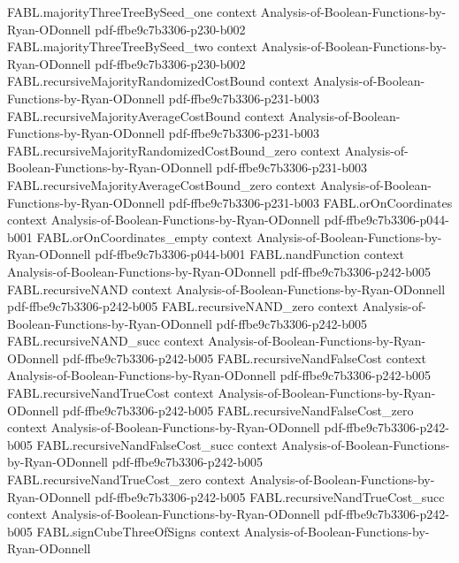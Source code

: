 \begin{theorem}
\proofstep
  {FABL.majorityThreeTreeBySeed_one}
  {context}
  {Analysis-of-Boolean-Functions-by-Ryan-ODonnell}
  {pdf-ffbe9c7b3306-p230-b002}
\proofstep
  {FABL.majorityThreeTreeBySeed_two}
  {context}
  {Analysis-of-Boolean-Functions-by-Ryan-ODonnell}
  {pdf-ffbe9c7b3306-p230-b002}
\proofstep
  {FABL.recursiveMajorityRandomizedCostBound}
  {context}
  {Analysis-of-Boolean-Functions-by-Ryan-ODonnell}
  {pdf-ffbe9c7b3306-p231-b003}
\proofstep
  {FABL.recursiveMajorityAverageCostBound}
  {context}
  {Analysis-of-Boolean-Functions-by-Ryan-ODonnell}
  {pdf-ffbe9c7b3306-p231-b003}
\proofstep
  {FABL.recursiveMajorityRandomizedCostBound_zero}
  {context}
  {Analysis-of-Boolean-Functions-by-Ryan-ODonnell}
  {pdf-ffbe9c7b3306-p231-b003}
\proofstep
  {FABL.recursiveMajorityAverageCostBound_zero}
  {context}
  {Analysis-of-Boolean-Functions-by-Ryan-ODonnell}
  {pdf-ffbe9c7b3306-p231-b003}
\proofstep
  {FABL.orOnCoordinates}
  {context}
  {Analysis-of-Boolean-Functions-by-Ryan-ODonnell}
  {pdf-ffbe9c7b3306-p044-b001}
\proofstep
  {FABL.orOnCoordinates_empty}
  {context}
  {Analysis-of-Boolean-Functions-by-Ryan-ODonnell}
  {pdf-ffbe9c7b3306-p044-b001}
\proofstep
  {FABL.nandFunction}
  {context}
  {Analysis-of-Boolean-Functions-by-Ryan-ODonnell}
  {pdf-ffbe9c7b3306-p242-b005}
\proofstep
  {FABL.recursiveNAND}
  {context}
  {Analysis-of-Boolean-Functions-by-Ryan-ODonnell}
  {pdf-ffbe9c7b3306-p242-b005}
\proofstep
  {FABL.recursiveNAND_zero}
  {context}
  {Analysis-of-Boolean-Functions-by-Ryan-ODonnell}
  {pdf-ffbe9c7b3306-p242-b005}
\proofstep
  {FABL.recursiveNAND_succ}
  {context}
  {Analysis-of-Boolean-Functions-by-Ryan-ODonnell}
  {pdf-ffbe9c7b3306-p242-b005}
\proofstep
  {FABL.recursiveNandFalseCost}
  {context}
  {Analysis-of-Boolean-Functions-by-Ryan-ODonnell}
  {pdf-ffbe9c7b3306-p242-b005}
\proofstep
  {FABL.recursiveNandTrueCost}
  {context}
  {Analysis-of-Boolean-Functions-by-Ryan-ODonnell}
  {pdf-ffbe9c7b3306-p242-b005}
\proofstep
  {FABL.recursiveNandFalseCost_zero}
  {context}
  {Analysis-of-Boolean-Functions-by-Ryan-ODonnell}
  {pdf-ffbe9c7b3306-p242-b005}
\proofstep
  {FABL.recursiveNandFalseCost_succ}
  {context}
  {Analysis-of-Boolean-Functions-by-Ryan-ODonnell}
  {pdf-ffbe9c7b3306-p242-b005}
\proofstep
  {FABL.recursiveNandTrueCost_zero}
  {context}
  {Analysis-of-Boolean-Functions-by-Ryan-ODonnell}
  {pdf-ffbe9c7b3306-p242-b005}
\proofstep
  {FABL.recursiveNandTrueCost_succ}
  {context}
  {Analysis-of-Boolean-Functions-by-Ryan-ODonnell}
  {pdf-ffbe9c7b3306-p242-b005}
\proofstep
  {FABL.signCubeThreeOfSigns}
  {context}
  {Analysis-of-Boolean-Functions-by-Ryan-ODonnell}

\end{theorem}
